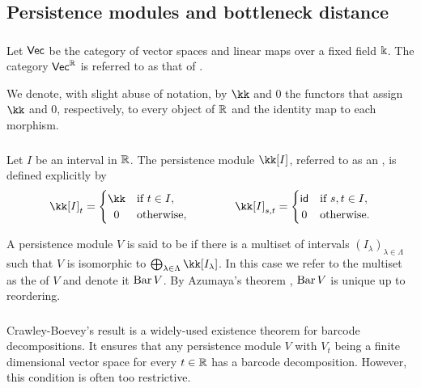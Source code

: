 \subsection{Persistence modules and bottleneck distance}

\subsubsection{}

Let $\Vec$ be the category of vector spaces and linear maps over a fixed field $\k$.
The category $\Vec^\R$ is referred to as that of .

We denote, with slight abuse of notation, by $\kk$ and $0$ the functors that assign $\kk$ and $0$, respectively, to every object of $\R$ and the identity map to each morphism.

\subsubsection{}

Let $I$ be an interval in $\R$.
The persistence module $\kk[I]$, referred to as an , is defined explicitly by
\[
\kk[I]_t =
\begin{cases}
	\kk & \text{if } t \in I, \\
	\hfil 0 & \text{otherwise},
\end{cases}
\qquad \qquad
\kk[I]_{s, t} =
\begin{cases}
	\id & \text{if } s, t \in I, \\
	\hfil 0 & \text{otherwise}.
\end{cases}
\]

A persistence module $V$ is said to be  if there is a multiset of intervals $(I_\lambda)_{\lambda \in \Lambda}$ such that $V$ is isomorphic to $\bigoplus_{\lambda \in \Lambda} \kk[I_\lambda]$.
In this case we refer to the multiset as the  of $V$ and denote it $\barc V$.
By Azumaya’s theorem \cite{azumaya1950theorem}, $\barc V$ is unique up to reordering.

\subsubsection{}

Crawley-Boevey's result \cite{Crawley-Boevey.2015} is a widely-used existence theorem for barcode decompositions.
It ensures that any persistence module \(V\) with \(V_t\) being a finite dimensional vector space for every \(t \in \R\) has a barcode decomposition.
However, this condition is often too restrictive.

